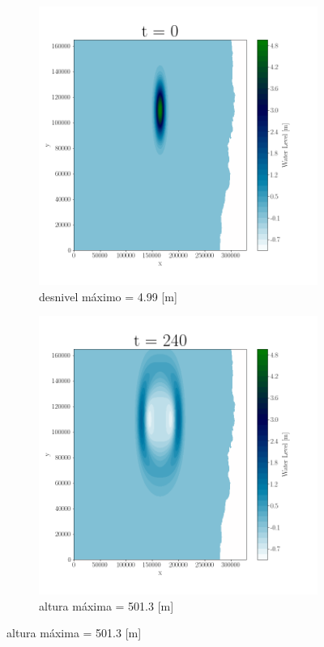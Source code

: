 
\begin{figure}[H]
\centering
\begin{subfigure}[b]{.4\linewidth}
\includegraphics[width=\linewidth]{Figures/Plots/Valpo1.png}
\caption{desnivel máximo = 4.99 [m]}
\end{subfigure}
\begin{subfigure}[b]{.4\linewidth}
\includegraphics[width=\linewidth]{Figures/Plots/Valpo2.png}
\caption{altura máxima = 501.3 [m]}
\end{subfigure}


\end{figure}
